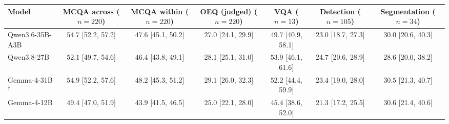 \setlength{\tabcolsep}{5pt}
\begin{tabular}{lcccccc}
\toprule
\textbf{Model} & \makecell{\textbf{MCQA across}\\($n=220$)} & \makecell{\textbf{MCQA within}\\($n=220$)} & \makecell{\textbf{OEQ (judged)}\\($n=220$)} & \makecell{\textbf{VQA}\\($n=13$)} & \makecell{\textbf{Detection}\\($n=105$)} & \makecell{\textbf{Segmentation}\\($n=34$)} \\
\midrule
Qwen3.6-35B-A3B & \makecell{$54.7$\\{[52.2, 57.2]}} & \makecell{$47.6$\\{[45.1, 50.2]}} & \makecell{$27.0$\\{[24.1, 29.9]}} & \makecell{$49.7$\\{[40.9, 58.1]}} & \makecell{$23.0$\\{[18.7, 27.3]}} & \makecell{$30.0$\\{[20.6, 40.3]}} \\
Qwen3.8-27B & \makecell{$52.1$\\{[49.7, 54.6]}} & \makecell{$46.4$\\{[43.8, 49.1]}} & \makecell{$28.1$\\{[25.1, 31.0]}} & \makecell{$53.9$\\{[46.1, 61.6]}} & \makecell{$\mathbf{24.7}$\\{[20.6, 28.9]}} & \makecell{$28.6$\\{[20.0, 38.2]}} \\
Gemma-4-31B$^\dagger$ & \makecell{$\mathbf{54.9}$\\{[52.2, 57.6]}} & \makecell{$48.2$\\{[45.3, 51.2]}} & \makecell{$29.1$\\{[26.0, 32.3]}} & \makecell{$52.2$\\{[44.4, 59.9]}} & \makecell{$23.4$\\{[19.0, 28.0]}} & \makecell{$30.5$\\{[21.3, 40.7]}} \\
Gemma-4-12B & \makecell{$49.4$\\{[47.0, 51.9]}} & \makecell{$43.9$\\{[41.5, 46.5]}} & \makecell{$25.0$\\{[22.1, 28.0]}} & \makecell{$45.4$\\{[38.6, 52.0]}} & \makecell{$21.3$\\{[17.2, 25.5]}} & \makecell{$\mathbf{30.6}$\\{[21.4, 40.6]}} \\

\end{tabular}
